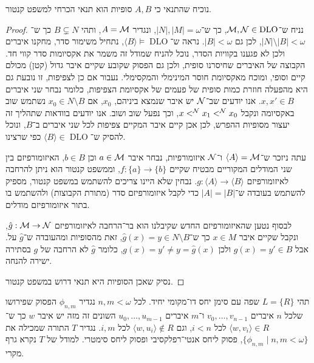 \subquestion{}
נוכיח שהתנאי כי $A, B$ סופיות הוא תנאי הכרחי למשפט קנטור.
\begin{proof}
	נניח ש־$\mathcal{M}, \mathcal{N} \in \operatorname{DLO}$, כך ש־$|N|, |M| = \omega$, ונגדיר $A = \mathcal{M}$, ותהי $B \subsetneq N$ כך ש־$|N| \setminus |B| < \omega$, לכן גם $|B| < \omega$.
	נראה ש־$\langle B \rangle \models \operatorname{DLO}$, נתחיל משימור סדר, מחקנו איברים ולכן לא פגענו בקוויות הסדר, נוכל להניח שמודל זה משמר את אקסיומות סדר קווי חד.
	הקבוצה של האיברים שחיסרנו סופית, ולכן גם הפסוק שקובע שקיים איבר גדול (קטן) מכולם קיים וסופי, ומוכח מאקסיומת חוסר המינימלי והמקסימלי.
	נעבור אם כן לצפיפות, זו נובעת גם היא מהפעלה חוזרת כמות סופית של פעמים של אקסיומת הצפיפות, כלומר נבחר שני איברים $x, x' \in B$.
	אנו יודעים שב־$\mathcal{N}$ יש איבר שנמצא ביניהם, $x_0$, אם $x_0 \in N \setminus B$ נשתמש שוב באקסיומה ונקבל $x <^{\mathcal{N}} x_1 <^{\mathcal{N}} x_0$, וכך נפעל שוב ושוב.
	אנו יודעים בוודאות שתהליך זה יעצור מסופיות ההפרש, לכן אכן קיים איבר המקיים צפיפות לכל שני איברים ב־$B$, ונוכל להסיק ש־$\langle B \rangle \in \operatorname{DLO}$ כפי שרצינו.

	עתה ניזכר ש־$\langle A \rangle = \mathcal{M}$ ו־$\mathcal{N}$ איזומורפיות, נבחר איבר $a \in \mathcal{M}$ וכן $b \in B$, האיזומורפיזם בין שני המודלים המקוריים מבטיח שקיים $f : \{ a \} \to \{ b \}$,
	וממשפט קנטור הוא ניתן להרחבה לאיזומורפיזם $g : \langle A \rangle \to \langle B \rangle$.
	נבחין שלא היינו צריכים להשתמש במשפט קנטור, מספיק להשתמש בעובדה ש־$|A| = |B|$ כדי לקבל איזומורפיזם סדר (מתורת הקבוצות) ולהשתמש בו בתור איזומורפיזם מודלים.

	לבסוף נטען שהאיזומורפיזם החדש שקיבלנו הוא בר־הרחבה לאיזומורפיזם $\hat{g} : \mathcal{M} \to \mathcal{N}$, ונקבל שקיים איבר $x \in M$ כך ש־$\hat{g}(x) = y \in N \setminus B$,
	זאת מהסופיות ומהעובדה ש־$\hat{g}$ על.
	אבל $g(x) = y' \in B$ ולכן $g(x) = y' \ne y = \hat{g}(x)$, כלומר $\hat{g}$ לא הרחבה של $g$ בסתירה ישירה להנחה.

	נסיק שאכן הסופיות היא תנאי דרוש במשפט קנטור.
\end{proof}

\question{}
תהי $L = \{ R \}$ שפה עם סימן יחס דו־מקומי יחיד.
לכל $n, m < \omega$ נגדיר $\phi_{n, m}$ הפסוק שפירושו שלכל $n$ איברים $v_0, \dots, v_{n - 1}$ ו־$m$ איברים $u_0, \dots, u_{m - 1}$ השונים זה מזה יש איבר $w$ כך ש־$\langle w, v_i \rangle \in R$ לכל $i < n$,
וגם $\langle w, u_i \rangle \notin R$ לכל $i , m$.
נגדיר $T$ התורה שמכילה את $\{ \phi_{n, m} \mid n, m < \omega \}$, פסוק ליחס אנטי־רפלקסיבי ופסוק ליחס סימטרי.
למודל של $T$ נקרא גרף מקרי.

